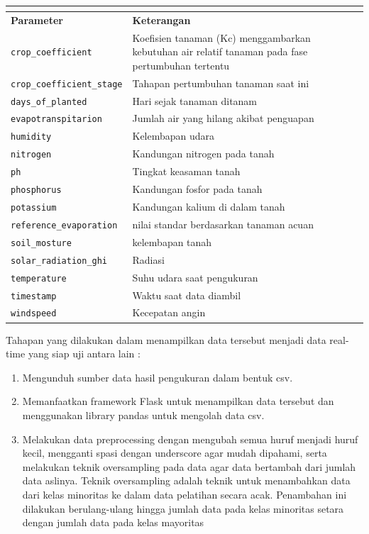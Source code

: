 \begin{enumerate}[label={\alph*.}]
\begin{longtable}{|p{.35\linewidth}|p{.60\linewidth}|}
{		} \\ \hline
		\textbf{Parameter} & \textbf{Keterangan} \\ \hline
		\texttt{crop\_coefficient} & Koefisien tanaman (Kc) menggambarkan kebutuhan air relatif tanaman pada fase pertumbuhan tertentu \\ \hline
		\texttt{crop\_coefficient\_stage} & Tahapan pertumbuhan tanaman saat ini \\ \hline
		\texttt{days\_of\_planted} & Hari sejak tanaman ditanam \\ \hline
		\texttt{evapotranspitarion} & Jumlah air yang hilang akibat penguapan \\ \hline
		\texttt{humidity} & Kelembapan udara \\ \hline
		\texttt{nitrogen} & Kandungan nitrogen pada tanah \\ \hline
		\texttt{ph} & Tingkat keasaman tanah \\ \hline
		\texttt{phosphorus} & Kandungan fosfor pada tanah \\ \hline
		\texttt{potassium} & Kandungan kalium di dalam tanah \\ \hline
		\texttt{reference\_evaporation} & nilai standar berdasarkan tanaman acuan\\ \hline
		\texttt{soil\_mosture} & kelembapan tanah \\ \hline
		\texttt{solar\_radiation\_ghi} & Radiasi\\ \hline
		\texttt{temperature} & Suhu udara saat pengukuran \\ \hline
		\texttt{timestamp} & Waktu saat data diambil \\ \hline
		\texttt{windspeed} & Kecepatan angin \\ \hline
	\end{longtable}
	Tahapan yang dilakukan dalam menampilkan data tersebut menjadi data real-time yang siap uji antara lain : 
	\begin{enumerate}[label={\arabic*.}]
		\item Mengunduh sumber data hasil pengukuran dalam bentuk csv. 
		\item Memanfaatkan framework Flask untuk menampilkan data tersebut dan menggunakan library pandas untuk mengolah data csv.
		\item Melakukan data preprocessing dengan mengubah semua huruf menjadi huruf kecil, mengganti spasi dengan underscore agar mudah dipahami, serta melakukan teknik oversampling pada data agar data bertambah dari jumlah data aslinya. Teknik oversampling adalah teknik untuk menambahkan data dari kelas minoritas ke dalam data pelatihan secara acak. Penambahan ini dilakukan berulang-ulang hingga jumlah data pada kelas minoritas setara dengan jumlah data pada kelas mayoritas \cite{Diantika2023}

\end{enumerate}
\end{enumerate}
